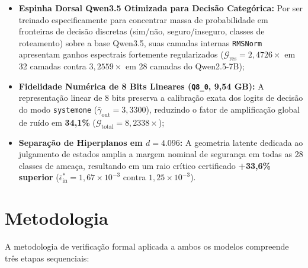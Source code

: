 \documentclass[11pt,a4paper]{article}
\theoremstyle{definition}
\begin{document}
\begin{enumerate}
\begin{itemize}
        \item \textbf{Espinha Dorsal Qwen3.5 Otimizada para Decisão Categórica:} Por ser treinado especificamente para concentrar massa de probabilidade em fronteiras de decisão discretas (sim/não, seguro/inseguro, classes de roteamento) sobre a base Qwen3.5, suas camadas internas \texttt{RMSNorm} apresentam ganhos espectrais fortemente regularizados ($\mathcal{G}_{\text{res}} = 2{,}4726\times$ em 32 camadas contra $3{,}2559\times$ em 28 camadas do Qwen2.5-7B);
        \item \textbf{Fidelidade Numérica de 8 Bits Lineares (\texttt{Q8\_0}, 9,54 GB):} A representação linear de 8 bits preserva a calibração exata dos logits de decisão do modo \texttt{systemone} ($\bar{\gamma}_{\text{out}} = 3{,}3300$), reduzindo o fator de amplificação global de ruído em \textbf{34,1\%} ($\mathcal{G}_{\text{total}} = 8{,}2338\times$);
        \item \textbf{Separação de Hiperplanos em $d = 4.096$:} A geometria latente dedicada ao julgamento de estados amplia a margem nominal de segurança em todas as 28 classes de ameaça, resultando em um raio crítico certificado \textbf{+33,6\% superior} ($\bar{\epsilon}_{\text{in}}^* = 1{,}67 \times 10^{-3}$ contra $1{,}25 \times 10^{-3}$).
    \end{itemize}
\end{enumerate}

\section{Metodologia}

A metodologia de verificação formal aplicada a ambos os modelos compreende três etapas sequenciais:
\end{document}
